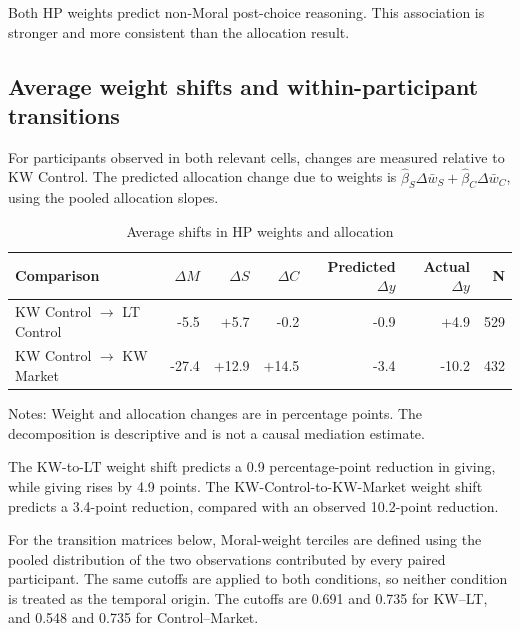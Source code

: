 \documentclass{article}
\begin{document}
Both HP weights predict non-Moral post-choice reasoning. This association is stronger and more consistent than the allocation result.

\subsection{Average weight shifts and within-participant transitions}

For participants observed in both relevant cells, changes are measured relative to KW Control. The predicted allocation change due to weights is $\widehat\beta_S\Delta\bar w_S+\widehat\beta_C\Delta\bar w_C$, using the pooled allocation slopes.

\begin{table}[H]
\centering
\caption{Average shifts in HP weights and allocation}
\label{tab:within_weight_shifts}
\begin{tabular}{lrrrrrr}
\toprule
Comparison & $\Delta M$ & $\Delta S$ & $\Delta C$ & Predicted $\Delta y$ & Actual $\Delta y$ & N \\
\midrule
KW Control $\rightarrow$ LT Control & -5.5 & +5.7 & -0.2 & -0.9 & +4.9 & 529 \\
KW Control $\rightarrow$ KW Market & -27.4 & +12.9 & +14.5 & -3.4 & -10.2 & 432 \\
\bottomrule
\end{tabular}
\begin{flushleft}
\footnotesize Notes: Weight and allocation changes are in percentage points. The decomposition is descriptive and is not a causal mediation estimate.
\end{flushleft}
\end{table}

The KW-to-LT weight shift predicts a 0.9 percentage-point reduction in giving, while giving rises by 4.9 points. The KW-Control-to-KW-Market weight shift predicts a 3.4-point reduction, compared with an observed 10.2-point reduction.

\pagebreak
For the transition matrices below, Moral-weight terciles are defined using the pooled distribution of the two observations contributed by every paired participant. The same cutoffs are applied to both conditions, so neither condition is treated as the temporal origin. The cutoffs are 0.691 and 0.735 for KW--LT, and 0.548 and 0.735 for Control--Market.
\end{document}
